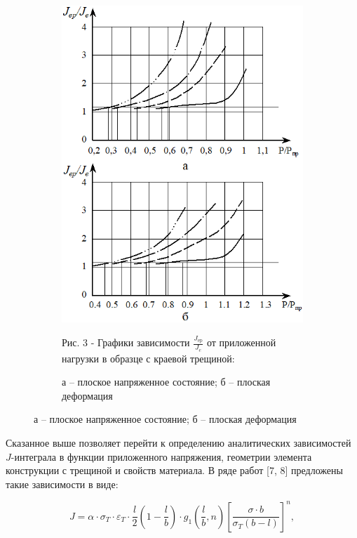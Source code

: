 \begin{figure}[H]
\begin{subfigure}[b]{0.45\textwidth}
        \includegraphics[width=\textwidth]{assets/1150}
		\caption*{Рис. 3 - Графики зависимости $\frac{J_{\text{ep}}}{J_{e}}$ от приложенной нагрузки в образце с краевой трещиной:}
		\caption*{а -- плоское напряженное состояние; б -- плоская деформация}
    \end{subfigure}
\end{figure}

\begin{multicols}{2}
Сказанное выше позволяет перейти к определению аналитических
зависимостей $J$-интеграла в функции
приложенного напряжения, геометрии элемента конструкции с трещиной и
свойств материала. В ряде работ {[}7, 8{]} предложены такие зависимости
в виде:
\end{multicols}

\begin{equation}
J = \alpha \cdot \sigma_{T} \cdot \varepsilon_{T} \cdot \frac{l}{2} \left( 1 - \frac{l}{b} \right) \cdot g_{1} \left( \frac{l}{b}, n \right) \left[ \frac{\sigma \cdot b}{\sigma_{T} \left( b - l \right)} \right]^{n},
\end{equation}

